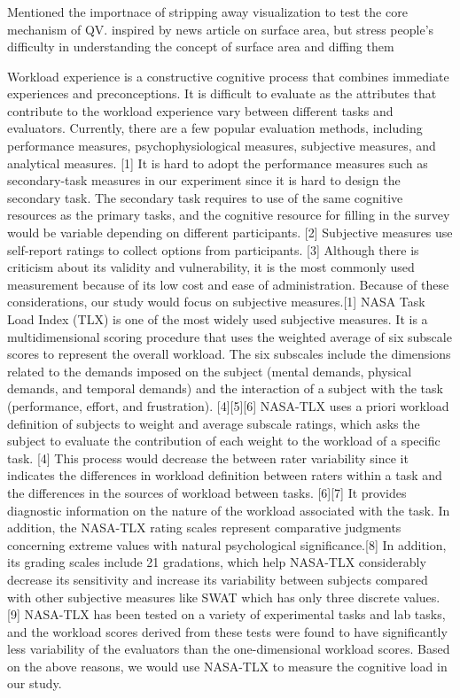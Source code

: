 \subsubsection{}
Mentioned the importnace of stripping away visualization to test the core mechanism of QV.
inspired by news article on surface area, but stress people's difficulty in understanding the concept of surface area and diffing them





Workload experience is a constructive cognitive process that combines immediate experiences and preconceptions. 
It is difficult to evaluate as the attributes that contribute to the workload experience vary between different tasks and evaluators. Currently, there are a few popular evaluation methods, including performance measures, psychophysiological measures, subjective measures, and analytical measures. [1] It is hard to adopt the performance measures such as secondary-task measures in our experiment since it is hard to design the secondary task. The secondary task requires to use of the same cognitive resources as the primary tasks, and the cognitive resource for filling in the survey would be variable depending on different participants. [2] Subjective measures use self-report ratings to collect options from participants. [3] Although there is criticism about its validity and vulnerability, it is the most commonly used measurement because of its low cost and ease of administration.  Because of these considerations, our study would focus on subjective measures.[1] NASA Task Load Index (TLX) is one of the most widely used subjective measures. It is a multidimensional scoring procedure that uses the weighted average of six subscale scores to represent the overall workload. The six subscales include the dimensions related to the demands imposed on the subject (mental demands, physical demands, and temporal demands) and the interaction of a subject with the task (performance, effort, and frustration). [4][5][6] NASA-TLX uses a priori workload definition of subjects to weight and average subscale ratings, which asks the subject to evaluate the contribution of each weight to the workload of a specific task. [4] This process would decrease the between rater variability since it indicates the differences in workload definition between raters within a task and the differences in the sources of workload between tasks. [6][7] It provides diagnostic information on the nature of the workload associated with the task. In addition, the NASA-TLX rating scales represent comparative judgments concerning extreme values with natural psychological significance.[8] In addition, its grading scales include 21 gradations, which help NASA-TLX considerably decrease its sensitivity and increase its variability between subjects compared with other subjective measures like SWAT which has only three discrete values. [9] NASA-TLX has been tested on a variety of experimental tasks and lab tasks, and the workload scores derived from these tests were found to have significantly less variability of the evaluators than the one-dimensional workload scores. Based on the above reasons, we would use NASA-TLX to measure the cognitive load in our study.
